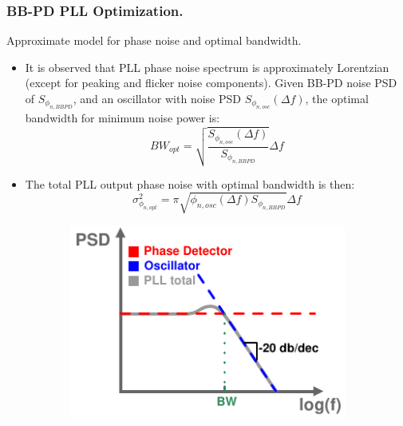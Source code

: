 \documentclass[t, screen, aspectratio=43]{beamer}
\begin{document}
\begin{frame}
	\frametitle{BB-PD PLL Optimization.}
	\begin{block}{Approximate model for phase noise and optimal bandwidth.}
	\tiny
	\begin{itemize}[itemsep=4pt,label=\protect---]
		\item It is observed that PLL phase noise spectrum is approximately Lorentzian (except for peaking and flicker noise components). Given BB-PD noise PSD of $S_{\phi_{n,BBPD}}$, and an oscillator with noise PSD $S_{\phi_{n,osc}}(\Delta f)$, the optimal bandwidth for minimum noise power is:
		\tiny
		\begin{equation}
			BW_{opt} =  \sqrt{\frac{S_{\phi_{n,osc}}(\Delta f)}{S_{\phi_{n,BBPD}}}}\Delta f
		\end{equation}
		\item The total PLL output phase noise with optimal bandwidth is then:
		\tiny
		\begin{equation}
			\sigma^2_{\phi_{n,opt}} =   \pi\sqrt{\phi_{n,osc}(\Delta f)S_{\phi_{n,BBPD}}}\Delta f
		\end{equation}
	\end{itemize}
	\vspace{-3em}
	\begin{figure}[htb!]
	    \centering
	    \begin{subfigure}{0.33\textwidth}
	        \centering
	        \includegraphics[width=1\textwidth, angle=0]{pll_spectrum_lorentzian.pdf}
	    \end{subfigure}%
	    \begin{subfigure}{0.33\textwidth}
	        \centering

\end{subfigure}
\end{figure}
\end{block}
\end{frame}
\end{document}
